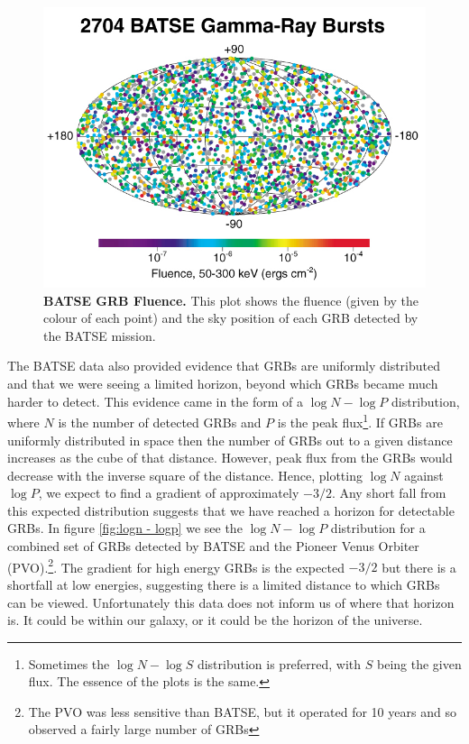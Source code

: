 \documentclass[11pt]{cuthesis}
\begin{document}
\begin{figure} %
\begin{center}
\includegraphics[width=0.8\linewidth]{batse_grbs_fluence.jpg}
\end{center}
\caption{\textbf{BATSE GRB Fluence.} This plot shows the fluence (given by the colour of each point) and the sky position of each GRB detected by the BATSE mission. \cite{BATSE_dist} }
\label{fig:batse grb fluence}
\end{figure}

The BATSE data also provided evidence that GRBs are uniformly distributed and that we were seeing a limited horizon, beyond which GRBs became much harder to detect. This evidence came in the form of a $\log N - \log P$ distribution, where $N$ is the number of detected GRBs and $P$ is the peak flux\footnote{Sometimes the $\log N - \log S$ distribution is preferred, with $S$ being the given flux. The essence of the plots is the same.}. If GRBs are uniformly distributed in space then the number of GRBs out to a given distance increases as the cube of that distance. However, peak flux from the GRBs would decrease with the inverse square of the distance. Hence, plotting  $\log N$ against $\log P$, we expect to find a gradient of approximately $-3/2$. Any short fall from this expected distribution suggests that we have reached a horizon for detectable GRBs. In figure \ref{fig:logn - logp} we see the $\log N - \log P$ distribution for a combined set of GRBs detected by BATSE and the Pioneer Venus Orbiter (PVO).\footnote{ The PVO was less sensitive than BATSE, but it operated for 10 years and so observed a fairly large number of GRBs}. The gradient for high energy GRBs is the expected $-3/2$ but there is a shortfall at low energies, suggesting there is a limited distance to which GRBs can be viewed. Unfortunately this data does not inform us of where that horizon is. It could be within our galaxy, or it could be the horizon of the universe.   
\end{document}
